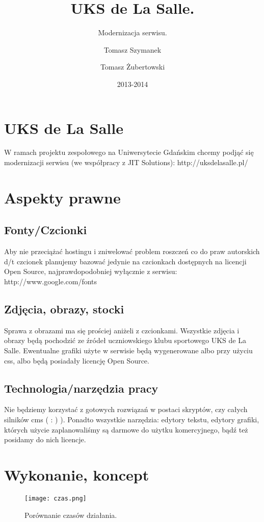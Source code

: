 \documentclass{scrartcl}
\title{UKS de La Salle.}
\subtitle{Modernizacja serwisu.}
\author{Tomasz Szymanek
\and
Tomasz Żubertowski}
\date{2013-2014}
\begin{document}
\maketitle

\section{UKS de La Salle}
W ramach projektu zespołowego na Uniwersytecie Gdańskim chcemy podjąć się modernizacji serwisu (we współpracy z JIT Solutions):
http://uksdelasalle.pl/
\section{Aspekty prawne}
\subsection{Fonty/Czcionki}
Aby nie przeciążać hostingu i zniwelować problem roszczeń co do praw autorskich d/t czcionek planujemy bazować jedynie na czcionkach dostępnych na licencji Open Source, najprawdopodobniej wyłącznie z serwisu: 
http://www.google.com/fonts
\subsection{Zdjęcia, obrazy, stocki}
Sprawa z obrazami ma się prościej aniżeli z czcionkami. Wszystkie zdjęcia i obrazy będą pochodzić ze źródeł uczniowskiego klubu sportowego UKS de La Salle. Ewentualne grafiki użyte w serwisie będą wygenerowane albo przy użyciu css, albo będą posiadały licencję Open Source.
\subsection{Technologia/narzędzia pracy}
Nie będziemy korzystać z gotowych rozwiązań w postaci skryptów, czy całych silników cms ( : ) ). Ponadto wszystkie narzędzia: edytory tekstu, edytory grafiki, których użycie zaplanowaliśmy są darmowe do użytku komercyjnego, bądź też posidamy do nich licencje.

\section{Wykonanie, koncept}

\begin{figure}[h!]
  \caption{Porównanie czasów działania.}
  \centering
    \texttt{[image: czas.png]}
\end{figure}



\end{document}
